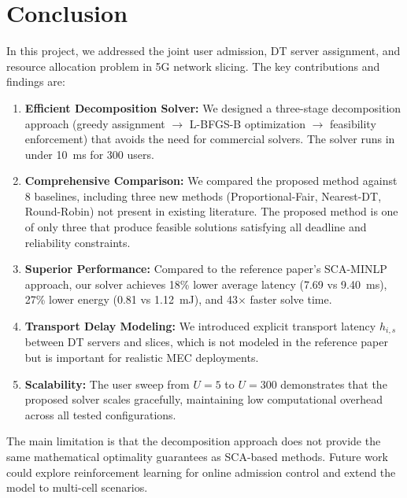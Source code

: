 \documentclass[12pt]{article}
\begin{document}
\newpage

\section{Conclusion}

In this project, we addressed the joint user admission, DT server assignment, and resource allocation problem in 5G network slicing. The key contributions and findings are:

\begin{enumerate}
    \item \textbf{Efficient Decomposition Solver:} We designed a three-stage decomposition approach (greedy assignment $\rightarrow$ L-BFGS-B optimization $\rightarrow$ feasibility enforcement) that avoids the need for commercial solvers. The solver runs in under 10~ms for 300 users.
    
    \item \textbf{Comprehensive Comparison:} We compared the proposed method against 8 baselines, including three new methods (Proportional-Fair, Nearest-DT, Round-Robin) not present in existing literature. The proposed method is one of only three that produce feasible solutions satisfying all deadline and reliability constraints.
    
    \item \textbf{Superior Performance:} Compared to the reference paper's SCA-MINLP approach, our solver achieves 18\% lower average latency (7.69 vs 9.40~ms), 27\% lower energy (0.81 vs 1.12~mJ), and 43$\times$ faster solve time.
    
    \item \textbf{Transport Delay Modeling:} We introduced explicit transport latency $h_{i,s}$ between DT servers and slices, which is not modeled in the reference paper but is important for realistic MEC deployments.
    
    \item \textbf{Scalability:} The user sweep from $U = 5$ to $U = 300$ demonstrates that the proposed solver scales gracefully, maintaining low computational overhead across all tested configurations.
\end{enumerate}

The main limitation is that the decomposition approach does not provide the same mathematical optimality guarantees as SCA-based methods. Future work could explore reinforcement learning for online admission control and extend the model to multi-cell scenarios.

\newpage


\end{document}
